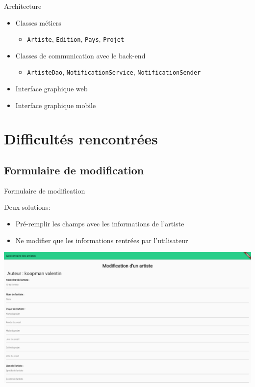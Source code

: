\documentclass{beamer}
\begin{document}
\begin{frame}{Architecture}

\begin{itemize}
    \item Classes métiers
    \begin{itemize}
        \item \texttt{Artiste}, \texttt{Edition}, \texttt{Pays}, \texttt{Projet}
    \end{itemize}
    \item Classes de communication avec le back-end
    \begin{itemize}
        \item \texttt{ArtisteDao}, \texttt{NotificationService},
        \texttt{NotificationSender}
    \end{itemize}
    \item Interface graphique web
    \item Interface graphique mobile
\end{itemize}

\end{frame}

\section{Difficultés rencontrées}

\subsection{Formulaire de modification}

\begin{frame}{Formulaire de modification}

Deux solutions:

\begin{itemize}
    \item Pré-remplir les champs avec les informations de l'artiste
    \item Ne modifier que les informations rentrées par l'utilisateur
\end{itemize}

\begin{center}
    \includegraphics[height=.5849\textheight]{formulaire.jpg}
\end{center}

\end{frame}
\end{document}
